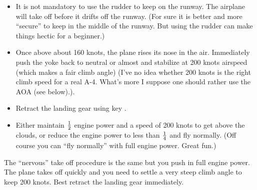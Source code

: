 \begin{itemize}
  \item It is not mandatory to use the rudder to keep on the runway. The airplane will take off before it drifts off the runway. (For sure it is better and more ``secure'' to keep in the middle of the runway. But using the rudder can make things hectic for a beginner.)
  \item Once above about 160 knots, the plane rises its nose in the air. Immediately push the yoke back to neutral or almost and stabilize at 200 knots airspeed (which makes a fair climb angle) (I've no idea whether 200 knots is the right climb speed for a real A-4. What's more I suppose one should rather use the AOA (see below).).
  \item Retract the landing gear using key  .
  \item Either maintain $1\over2$ engine power and a speed of 200 knots to get above the clouds, or reduce the engine power to less than $1\over4$ and fly normally. (Off course you can ``fly normally'' with full engine power. Great fun.)
\end{itemize}

The ``nervous'' take off procedure is the same but you push in full
engine power. The plane takes off quickly and you need to settle a very
steep climb angle to keep 200 knots. Best retract the landing gear
immediately.

